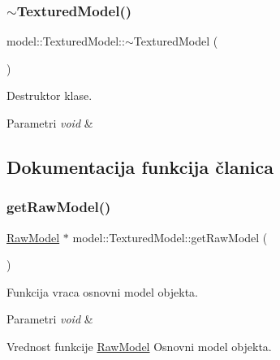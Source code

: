 \subsubsection{\texorpdfstring{$\sim$\+Textured\+Model()}{~TexturedModel()}}
{\footnotesize\ttfamily model\+::\+Textured\+Model\+::$\sim$\+Textured\+Model (\begin{DoxyParamCaption}{ }\end{DoxyParamCaption})}



Destruktor klase. 


\begin{DoxyParams}{Parametri}
{\em void} & \\
\hline
\end{DoxyParams}


\subsection{Dokumentacija funkcija članica}
\mbox{\label{classmodel_1_1TexturedModel_a9382bc8fb867a7f9ef8b120f0805b4b6}} 
\subsubsection{\texorpdfstring{get\+Raw\+Model()}{getRawModel()}}
{\footnotesize\ttfamily \hyperlink{classmodel_1_1RawModel}{Raw\+Model} $\ast$ model\+::\+Textured\+Model\+::get\+Raw\+Model (\begin{DoxyParamCaption}\item[{void}]{ }\end{DoxyParamCaption})}



Funkcija vraca osnovni model objekta. 


\begin{DoxyParams}{Parametri}
{\em void} & \\
\hline
\end{DoxyParams}
\begin{DoxyReturn}{Vrednost funkcije}
\hyperlink{classmodel_1_1RawModel}{Raw\+Model} Osnovni model objekta. 
\end{DoxyReturn}
\mbox{\label{classmodel_1_1TexturedModel_a09314a66eefacd609fc3bc414b8c5da7}} 

